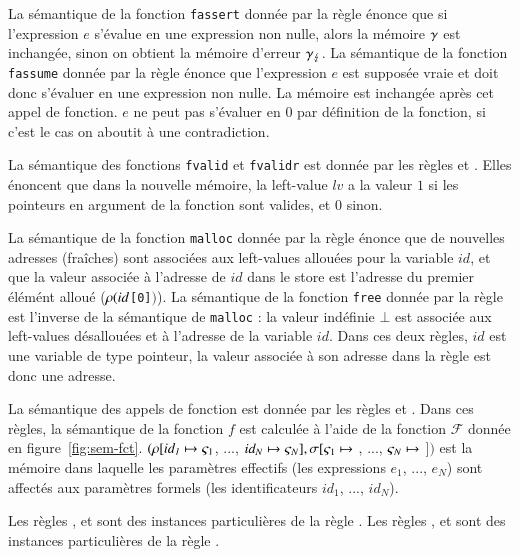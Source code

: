 La sémantique de la fonction \lstinline'fassert' donnée par la règle
 énonce que si l'expression $e$ s'évalue en une expression
non nulle, alors la mémoire $\gamma$ est inchangée, sinon on obtient
la mémoire d'erreur $\gamma_\lightning$.
La sémantique de la fonction \lstinline'fassume' donnée par la règle
 énonce que l'expression $e$ est supposée vraie et
doit donc s'évaluer en une expression non nulle.
La mémoire est inchangée après cet appel de fonction.
$e$ ne peut pas s'évaluer en $0$ par définition de la fonction, si c'est
le cas on aboutit à une contradiction.

La sémantique des fonctions \lstinline'fvalid' et \lstinline'fvalidr' est donnée
par les règles  et .
Elles énoncent que dans la nouvelle mémoire, la left-value $\mathit{lv}$ a
la valeur $1$ si les pointeurs en argument de la fonction sont valides, et $0$
sinon.

La sémantique de la fonction \lstinline'malloc' donnée par la règle
 énonce que de nouvelles adresses (fraîches) sont associées
aux left-values allouées pour la variable $\textit{id}$, et que la valeur
associée à l'adresse de $\textit{id}$ dans le store est l'adresse du premier
élémént alloué ($\rho(\mathit{id}$\lstinline'[0]'$)$).
La sémantique de la fonction \lstinline'free' donnée par la règle
 est l'inverse de la sémantique de \lstinline'malloc' : la
valeur indéfinie $\bot$ est associée aux left-values désallouées et à l'adresse
de la variable $\textit{id}$.
Dans ces deux règles, $\textit{id}$ est une variable de type pointeur, la
valeur associée à son adresse dans la règle  est donc une
adresse.

La sémantique des appels de fonction est donnée par les règles 
et .
Dans ces règles, la sémantique de la fonction $f$ est calculée à
l'aide de la fonction $\mathcal{F}$ donnée en figure~\ref{fig:sem-fct}.
$(\rho[\mathit{id_1} \mapsto \varsigma_1$, ...,
  $\mathit{id_N} \mapsto \varsigma_N], \sigma[\varsigma_1 \mapsto$
  , ...,
  $\varsigma_N \mapsto$  $])$
est la mémoire dans laquelle les paramètres effectifs (les expressions
$e_1$, ..., $e_N$) sont affectés aux paramètres formels (les identificateurs
$\mathit{id_1}$, ..., $\mathit{id_N}$).

Les règles ,  et  sont
des instances particulières de la règle .
Les règles ,  et  sont
des instances particulières de la règle .

